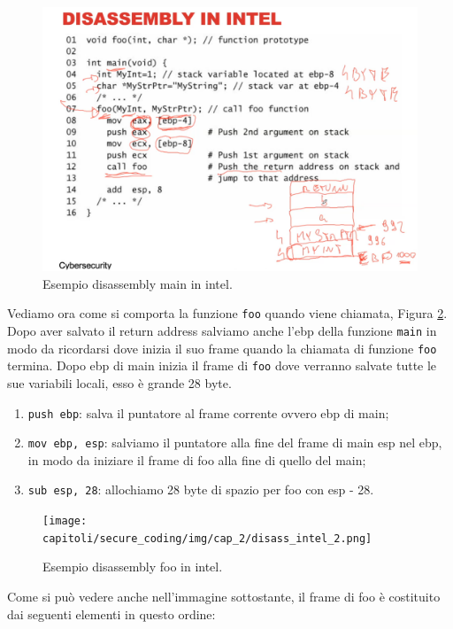 \begin{figure}[H]
    \centering
    \includegraphics[width=13cm, keepaspectratio]{capitoli/secure_coding/img/cap_2/disass_intel_1.png}
    \caption{Esempio disassembly main in intel.}\label{fig:disass_intel_1}
\end{figure}

Vediamo ora come si comporta la funzione \verb|foo| quando viene chiamata,
Figura \ref{fig:disass_intel_2}. Dopo aver salvato il return address salviamo anche
l'ebp della funzione \verb|main| in modo da ricordarsi dove inizia il suo frame
quando la chiamata di funzione \verb|foo| termina. Dopo ebp di main inizia il
frame di \verb|foo| dove verranno salvate tutte le sue variabili locali,
esso è grande 28 byte.

\begin{enumerate}
    \item \verb|push ebp|: salva il puntatore al frame corrente ovvero ebp di main;
    \item \verb|mov ebp, esp|: salviamo il puntatore alla fine del frame di main
          esp nel ebp, in modo da iniziare il frame di foo alla fine di quello del main;
    \item \verb|sub esp, 28|: allochiamo 28 byte di spazio per foo con esp - 28.
\end{enumerate}

\begin{figure}[H]
    \centering
    \texttt{[image: capitoli/secure\_coding/img/cap\_2/disass\_intel\_2.png]}
    \caption{Esempio disassembly foo in intel.}\label{fig:disass_intel_2}
\end{figure}

Come si può vedere anche nell'immagine sottostante, il frame di foo è costituito dai
seguenti elementi in questo ordine:

